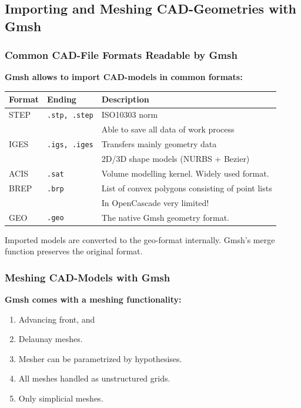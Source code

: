 \subsection{Importing and Meshing CAD-Geometries with Gmsh}

\begin{frame}
  \frametitle{Common CAD-File Formats Readable by Gmsh}
  \textbf{Gmsh allows to import CAD-models in common formats:}
  \begin{center}
    \begin{tabular}{|l|l|l|}
      \hline
      Format & Ending & Description
      \\
      \hline
      \hline
      STEP & \lstinline!.stp, .step! & ISO10303 norm\\
      & & Able to save all data of work process
      \\
      \hline
      IGES & \lstinline!.igs, .iges! & Transfers mainly geometry data\\
      & & 2D/3D shape models (NURBS + Bezier)
      \\
      \hline
      ACIS & \lstinline!.sat! & Volume modelling kernel. Widely used format.
      \\
      \hline
      BREP & \lstinline!.brp! & List of convex polygons consisting of point lists\\
      & & In OpenCascade very limited!
      \\
      \hline
      GEO & \lstinline!.geo! & The native Gmsh geometry format.
      \\
      \hline
    \end{tabular}
  \end{center}
  Imported models are converted to the geo-format internally. Gmsh's merge
  function preserves the original format.
\end{frame}

\begin{frame}
  \frametitle{Meshing CAD-Models with Gmsh}
  \textbf{Gmsh comes with a meshing functionality:}
  \begin{enumerate}
    \item Advancing front, and
    \item Delaunay meshes.
    \item Mesher can be parametrized by hypothesises.
    \item All meshes handled as unstructured grids.
    \item Only simplicial meshes.
  \end{enumerate}
\end{frame}

